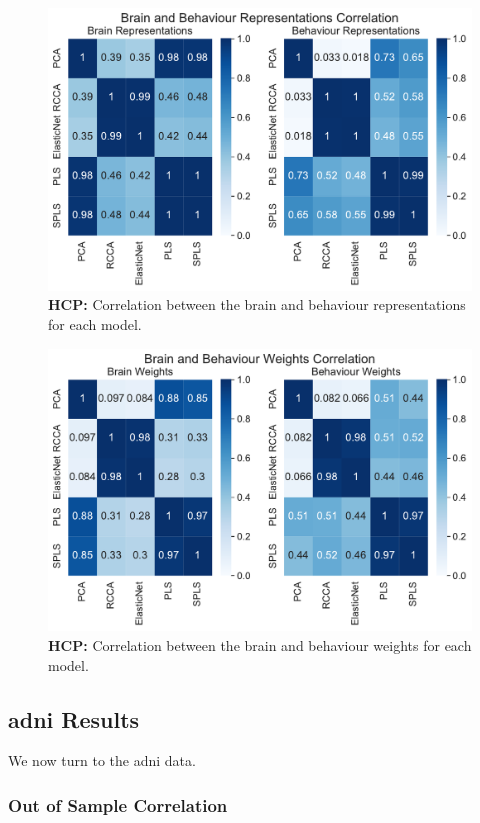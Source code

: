 \begin{figure}
    \centering
    \includegraphics[width=0.8\linewidth]{figures/hcp/brain and behaviour scores correlation}
    \caption{\textbf{HCP:} Correlation between the brain and behaviour \gls{representations} for each model.}\label{fig:brain-behaviour-scores-sim}
\end{figure}

\begin{figure}
    \centering
    \includegraphics[width=0.8\linewidth]{figures/hcp/brain and behaviour weights correlation}
    \caption{\textbf{HCP:} Correlation between the brain and behaviour \gls{weights} for each model.}\label{fig:brain-behaviour-weights-sim}
\end{figure}

\newpage

\subsection{\acrshort{adni} Results}\label{subsec:adni}

We now turn to the \acrshort{adni} data.

\subsubsection{Out of Sample Correlation}

